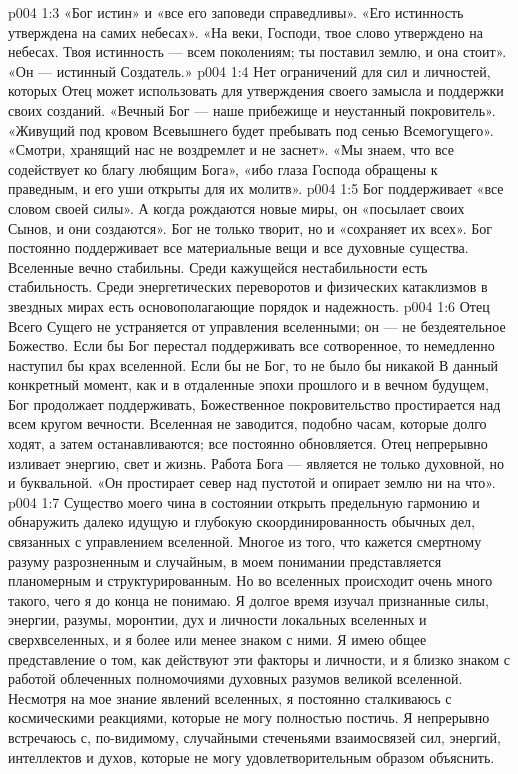 \vs p004 1:3 «Бог истин» и «все его заповеди справедливы». «Его истинность утверждена на самих небесах». «На веки, Господи, твое слово утверждено на небесах. Твоя истинность --- всем поколениям; ты поставил землю, и она стоит». «Он --- истинный Создатель.»
\vs p004 1:4 Нет ограничений для сил и личностей, которых Отец может использовать для утверждения своего замысла и поддержки своих созданий. «Вечный Бог --- наше прибежище и неустанный покровитель». «Живущий под кровом Всевышнего будет пребывать под сенью Всемогущего». «Смотри, хранящий нас не воздремлет и не заснет». «Мы знаем, что все содействует ко благу любящим Бога», «ибо глаза Господа обращены к праведным, и его уши открыты для их молитв».
\vs p004 1:5 Бог поддерживает «все словом своей силы». А когда рождаются новые миры, он «посылает своих Сынов, и они создаются». Бог не только творит, но и «сохраняет их всех». Бог постоянно поддерживает все материальные вещи и все духовные существа. Вселенные вечно стабильны. Среди кажущейся нестабильности есть стабильность. Среди энергетических переворотов и физических катаклизмов в звездных мирах есть основополагающие порядок и надежность.
\vs p004 1:6 Отец Всего Сущего не устраняется от управления вселенными; он --- не бездеятельное Божество. Если бы Бог перестал поддерживать все сотворенное, то немедленно наступил бы крах вселенной. Если бы не Бог, то не было бы никакой  В данный конкретный момент, как и в отдаленные эпохи прошлого и в вечном будущем, Бог продолжает поддерживать, Божественное покровительство простирается над всем кругом вечности. Вселенная не заводится, подобно часам, которые долго ходят, а затем останавливаются; все постоянно обновляется. Отец непрерывно изливает энергию, свет и жизнь. Работа Бога --- является не только духовной, но и буквальной. «Он простирает север над пустотой и опирает землю ни на что».
\vs p004 1:7 \pc Существо моего чина в состоянии открыть предельную гармонию и обнаружить далеко идущую и глубокую скоординированность обычных дел, связанных с управлением вселенной. Многое из того, что кажется смертному разуму разрозненным и случайным, в моем понимании представляется планомерным и структурированным. Но во вселенных происходит очень много такого, чего я до конца не понимаю. Я долгое время изучал признанные силы, энергии, разумы, моронтии, дух и личности локальных вселенных и сверхвселенных, и я более или менее знаком с ними. Я имею общее представление о том, как действуют эти факторы и личности, и я близко знаком с работой облеченных полномочиями духовных разумов великой вселенной. Несмотря на мое знание явлений вселенных, я постоянно сталкиваюсь с космическими реакциями, которые не могу полностью постичь. Я непрерывно встречаюсь с, по\hyp{}видимому, случайными стеченьями взаимосвязей сил, энергий, интеллектов и духов, которые не могу удовлетворительным образом объяснить.
